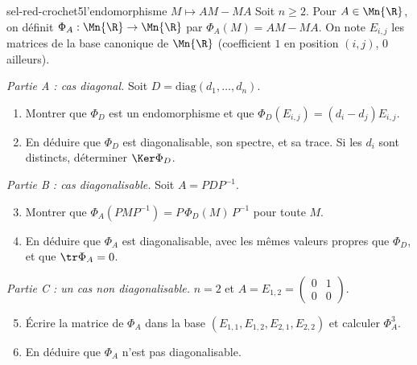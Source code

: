 \begin{exo}{sel-red-crochet}{5}{l'endomorphisme $M\mapsto AM-MA$}
Soit $n\geq2$. Pour $A\in\Mn{\R}$, on définit $\Phi_A:\Mn{\R}\to\Mn{\R}$ par $\Phi_A(M)=AM-MA$. On note $E_{i,j}$ les matrices de la
base canonique de $\Mn{\R}$ (coefficient $1$ en position $(i,j)$, $0$ ailleurs).

\emph{Partie A : cas diagonal.} Soit $D=\mathrm{diag}(d_1,\dots,d_n)$.
\begin{enumerate}
\item Montrer que $\Phi_D$ est un endomorphisme et que $\Phi_D(E_{i,j})=(d_i-d_j)E_{i,j}$.
\item En déduire que $\Phi_D$ est diagonalisable, son spectre, et sa trace. Si les $d_i$ sont distincts, déterminer $\Ker\Phi_D$.
\end{enumerate}
\emph{Partie B : cas diagonalisable.} Soit $A=PDP^{-1}$.
\begin{enumerate}\setcounter{enumi}{2}
\item Montrer que $\Phi_A(PMP^{-1})=P\,\Phi_D(M)\,P^{-1}$ pour toute $M$.
\item En déduire que $\Phi_A$ est diagonalisable, avec les mêmes valeurs propres que $\Phi_D$, et que $\tr\Phi_A=0$.
\end{enumerate}
\emph{Partie C : un cas non diagonalisable.} $n=2$ et $A=E_{1,2}=\begin{pmatrix}0&1\\0&0\end{pmatrix}$.
\begin{enumerate}\setcounter{enumi}{4}
\item Écrire la matrice de $\Phi_A$ dans la base $(E_{1,1},E_{1,2},E_{2,1},E_{2,2})$ et calculer $\Phi_A^3$.
\item En déduire que $\Phi_A$ n'est pas diagonalisable.
\end{enumerate}
\end{exo}


